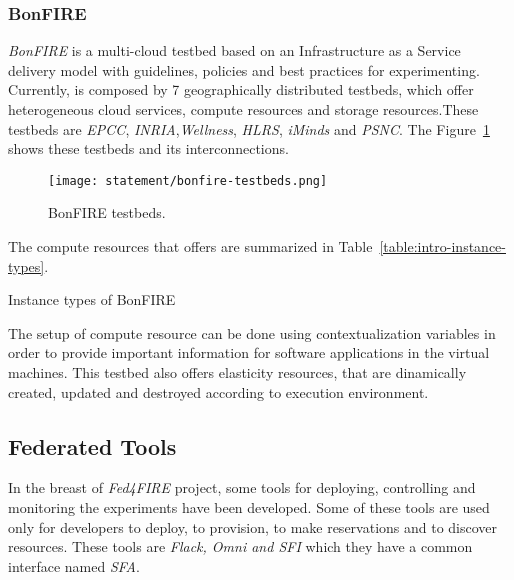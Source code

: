 \subsubsection{BonFIRE}

\emph{BonFIRE} is a multi-cloud testbed based on an Infrastructure as a Service
delivery model with guidelines, policies and best practices for
experimenting. Currently, \bonfire is composed by 7 geographically distributed
testbeds, which offer heterogeneous cloud services, compute resources and
storage resources.These testbeds are \emph{EPCC},\emph{ INRIA},\emph{Wellness},\emph{ HLRS}, \emph{iMinds} and \emph{PSNC}. The Figure~\ref{fig:intr-bonfire-testbeds} shows these testbeds and its interconnections.

\begin{figure}[!h]
\begin{center}
\texttt{[image: statement/bonfire-testbeds.png]}
\caption{BonFIRE testbeds.}
\label{fig:intr-bonfire-testbeds}
\end{center}
\end{figure}

The compute resources that \bonfire offers are summarized in Table~\ref{table:intro-instance-types}.

\begin{table}[hp]
  \centering
  {\small
  
  }
  \caption{Instance types of BonFIRE}
  \label{table:intro-instance-types}
\end{table}

The setup of compute resource can be done using contextualization variables in
order to provide important information for software applications in the virtual
machines. 
This testbed also offers elasticity resources, that are dinamically created,
updated and destroyed according to execution environment.


\subsection{Federated Tools}
\label{subsec:federatedtools}
In the breast of \emph{Fed4FIRE} project, some tools for deploying, controlling and
monitoring the experiments have been developed. 
Some of these tools are used only for developers to deploy, to provision, to
make reservations and to discover resources. These tools are \emph{Flack, Omni
  and SFI} which they have a common interface named \emph{SFA}.

